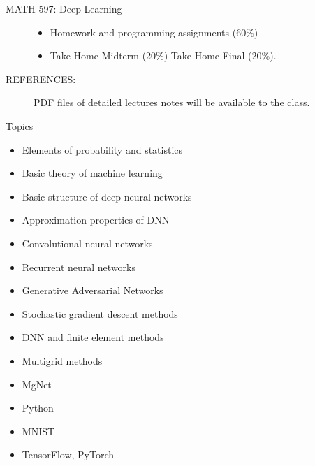 \documentclass{beamer}
\begin{document}
\begin{CJK*}{UTF8}{gbsn}
\begin{frame}{MATH 597: Deep Learning}
\begin{description}
  \begin{itemize}
  \item Homework and programming assignments  (60\%) 
\item Take-Home Midterm (20\%) Take-Home Final (20\%).
  \end{itemize}
\item[REFERENCES:]  PDF files of detailed lectures notes will be available to
the  class.
\end{description}

\end{frame}
\begin{frame}
{Topics}
\begin{itemize}
\item Elements of probability and statistics
\item Basic theory of machine learning
\item Basic structure of deep neural networks
\item Approximation properties of DNN 
\item Convolutional neural networks
\item Recurrent neural networks
\item Generative Adversarial Networks
\item Stochastic gradient descent methods 
\item DNN and finite element methods
\item Multigrid methods
\item MgNet
\item Python
\item MNIST
\item TensorFlow, PyTorch
\end{itemize}
\end{frame}
\end{CJK*}
\end{document}
